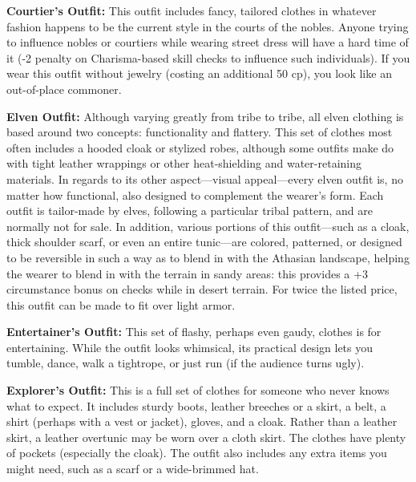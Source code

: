 
\textbf{Courtier's Outfit:} This outfit includes fancy, tailored clothes in whatever fashion happens to be the current style in the courts of the nobles. Anyone trying to influence nobles or courtiers while wearing street dress will have a hard time of it (-2 penalty on Charisma-based skill checks to influence such individuals). If you wear this outfit without jewelry (costing an additional 50 cp), you look like an out-of-place commoner.

\textbf{Elven Outfit:} Although varying greatly from tribe to tribe, all elven clothing is based around two concepts: functionality and flattery. This set of clothes most often includes a hooded cloak or stylized robes, although some outfits make do with tight leather wrappings or other heat-shielding and water-retaining materials. In regards to its other aspect---visual appeal---every elven outfit is, no matter how functional, also designed to complement the wearer’s form. Each outfit is tailor-made by elves, following a particular tribal pattern, and are normally not for sale. In addition, various portions of this outfit---such as a cloak, thick shoulder scarf, or even an entire tunic---are colored, patterned, or designed to be reversible in such a way as to blend in with the Athasian landscape, helping the wearer to blend in with the terrain in sandy areas: this provides a +3 circumstance bonus on  checks while in desert terrain. For twice the listed price, this outfit can be made to fit over light armor.

\textbf{Entertainer's Outfit:} This set of flashy, perhaps even gaudy, clothes is for entertaining. While the outfit looks whimsical, its practical design lets you tumble, dance, walk a tightrope, or just run (if the audience turns ugly).

\textbf{Explorer's Outfit:} This is a full set of clothes for someone who never knows what to expect. It includes sturdy boots, leather breeches or a skirt, a belt, a shirt (perhaps with a vest or jacket), gloves, and a cloak. Rather than a leather skirt, a leather overtunic may be worn over a cloth skirt. The clothes have plenty of pockets (especially the cloak). The outfit also includes any extra items you might need, such as a scarf or a wide-brimmed hat.

